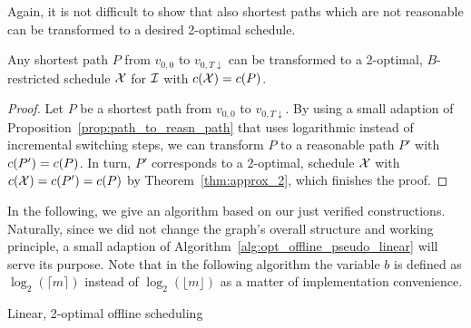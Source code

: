 Again, it is not difficult to show that also shortest paths which are not reasonable can be transformed to a desired 2-optimal schedule.
\begin{cor}\label{cor:opt_sched_short_path_pseudo_lin}
Any shortest path $P$ from $v_{0,0}$ to $v_{0,T\downarrow}$ can be transformed to a 2-optimal, $B$-restricted schedule $\mx$ for $\mathcal{I}$ with $c(\mathcal{X})=c(P)$.
\end{cor}
\begin{proof}
Let $P$ be a shortest path from $v_{0,0}$ to $v_{0,T\downarrow}$. By using a small adaption of Proposition~\ref{prop:path_to_reasn_path} that uses logarithmic instead of incremental switching steps, we can transform $P$ to a reasonable path $P'$ with $c(P')=c(P)$.
In turn, $P'$ corresponds to a 2-optimal,  schedule $\mx$ with $c(\mathcal{X})=c(P')=c(P)$ by Theorem~\ref{thm:approx_2}, which finishes the proof.
\end{proof}
In the following, we give an algorithm based on our just verified constructions. Naturally, since we did not change the graph's overall structure and working principle, a small adaption of Algorithm~\ref{alg:opt_offline_pseudo_linear} will serve its purpose. Note that in the following algorithm the variable $b$ is defined as $\log_2(\lceil m\rceil)$ instead of $\log_2(\lfloor m\rfloor)$ as a matter of implementation convenience.
\begin{algorithm}[H]
  \caption{Linear, 2-optimal offline scheduling}
  \label{alg:approx_2_offline_linear}
  \begin{algorithmic}[1]
	  \State \Return{$\mx$}
  \EndFunction
  \end{algorithmic}
\end{algorithm}
